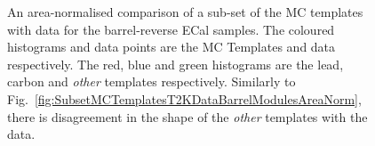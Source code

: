 \begin{figure}%
  \centering
  \hspace{1em}
  \caption{An area-normalised comparison of a sub-set of the MC templates with data for the barrel-reverse ECal samples.  The coloured histograms and data points are the MC Templates and data respectively.  The red, blue and green histograms are the lead, carbon and \textit{other} templates respectively.  Similarly to Fig.~\ref{fig:SubsetMCTemplatesT2KDataBarrelModulesAreaNorm}, there is disagreement in the shape of the \textit{other} templates with the data.}
  \label{fig:SubsetMCTemplatesT2KDataBarrelReverseModulesAreaNorm}
\end{figure}
